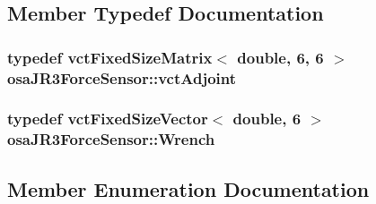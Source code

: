 \subsection{Member Typedef Documentation}
\hypertarget{classosa_j_r3_force_sensor_af769666ad69e4db31c2891ddf67d2abd}{}
\subsubsection[{vct\+Adjoint}]{\setlength{\rightskip}{0pt plus 5cm}typedef {\bf vct\+Fixed\+Size\+Matrix}$<$ double, 6, 6 $>$ {\bf osa\+J\+R3\+Force\+Sensor\+::vct\+Adjoint}}\label{classosa_j_r3_force_sensor_af769666ad69e4db31c2891ddf67d2abd}
\hypertarget{classosa_j_r3_force_sensor_afcfc2ba175b2e7ef9f86c6394c8966d2}{}
\subsubsection[{Wrench}]{\setlength{\rightskip}{0pt plus 5cm}typedef {\bf vct\+Fixed\+Size\+Vector}$<$ double, 6 $>$ {\bf osa\+J\+R3\+Force\+Sensor\+::\+Wrench}}\label{classosa_j_r3_force_sensor_afcfc2ba175b2e7ef9f86c6394c8966d2}


\subsection{Member Enumeration Documentation}
\hypertarget{classosa_j_r3_force_sensor_a6b27d3a601fae1547fb13d2a4ef97e4a}{}
